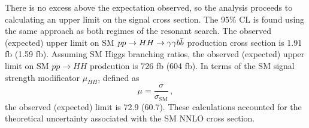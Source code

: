 There is no excess above the expectation observed, so the analysis proceeds to calculating an
upper limit on the signal cross section. The 95\% CL is found using the same approach as both
regimes of the resonant search. The observed (expected) upper limit on SM
$pp \rightarrow HH \rightarrow \gamma\gamma b\bar{b}$ production cross section is 1.91 fb (1.59 fb).
Assuming SM Higgs branching ratios, the observed (expected) upper limit on SM $pp \rightarrow HH$
prodcution is 726 fb (604 fb). In terms of the SM signal strength modificator $\mu_{HH}$, defined as
\begin{equation}
\mu = \frac{\sigma}{\sigma_\text{SM}} \, ,
\end{equation}
the observed (expected) limit is 72.9 (60.7). These calculations accounted for the theoretical
uncertainty associated with the SM NNLO cross section.


